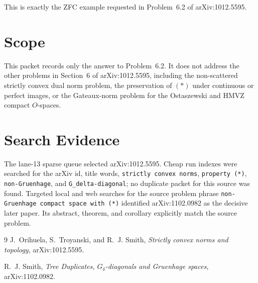 \documentclass[11pt]{article}
\begin{document}
This is exactly the ZFC example requested in Problem~6.2 of arXiv:1012.5595.

\section*{Scope}

This packet records only the answer to Problem~6.2.  It does not address the
other problems in Section~6 of arXiv:1012.5595, including the non-scattered
strictly convex dual norm problem, the preservation of \((*)\) under
continuous or perfect images, or the Gateaux-norm problem for the
Ostaszewski and HMVZ compact \(O\)-spaces.

\section*{Search Evidence}

The lane-13 sparse queue selected arXiv:1012.5595.  Cheap run indexes were
searched for the arXiv id, title words, \texttt{strictly convex norms},
\texttt{property (*)}, \texttt{non-Gruenhage}, and
\texttt{G\_delta-diagonal}; no duplicate packet for this source was found.
Targeted local and web searches for the source problem phrase
\texttt{non-Gruenhage compact space with (*)} identified arXiv:1102.0982 as
the decisive later paper.  Its abstract, theorem, and corollary explicitly
match the source problem.

\begin{thebibliography}{9}
J.~Orihuela, S.~Troyanski, and R.~J. Smith,
\emph{Strictly convex norms and topology},
arXiv:1012.5595.

R.~J. Smith,
\emph{Tree Duplicates, \(G_\delta\)-diagonals and Gruenhage spaces},
arXiv:1102.0982.
\end{thebibliography}
\end{document}
